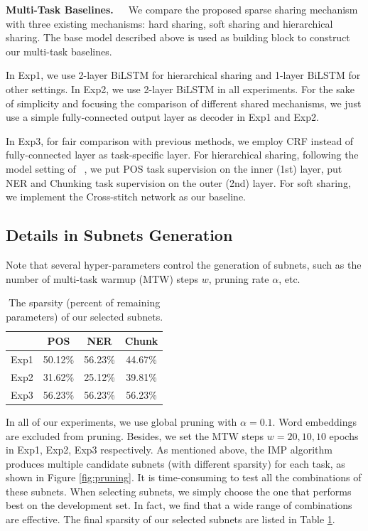 \documentclass[letterpaper]{article} %
\newcommand{\citet}[1]{\citeauthor{#1}~\shortcite{#1}}
\begin{document}
\textbf{Multi-Task Baselines.}\ \ \ We compare the proposed sparse sharing mechanism with three existing mechanisms: hard sharing, soft sharing and hierarchical sharing. The base model described above is used as building block to construct our multi-task baselines.

In Exp1, we use 2-layer BiLSTM for hierarchical sharing and 1-layer BiLSTM for other settings. In Exp2, we use 2-layer BiLSTM in all experiments.
For the sake of simplicity and focusing the comparison of different shared mechanisms, we just use a simple fully-connected output layer as decoder in Exp1 and Exp2.

In Exp3, for fair comparison with previous methods, we employ CRF \cite{DBLP:conf/icml/LaffertyMP01} instead of fully-connected layer as task-specific layer. For hierarchical sharing, following the model setting of \citet{DBLP:conf/acl/SogaardG16}, we put POS task supervision on the inner (1st) layer, put NER and Chunking task supervision on the outer (2nd) layer. For soft sharing, we implement the Cross-stitch network \cite{DBLP:conf/cvpr/MisraSGH16} as our baseline.

\subsection{Details in Subnets Generation}
Note that several hyper-parameters control the generation of subnets, such as the number of multi-task warmup (MTW) steps $w$, pruning rate $\alpha$, etc.

\begin{table}[htbp]
\centering
\begin{tabular}{lccc}
\toprule
     & POS     & NER     & Chunk   \\ \midrule
Exp1 & 50.12\% & 56.23\% & 44.67\% \\
Exp2 & 31.62\% & 25.12\% & 39.81\% \\
Exp3 & 56.23\% & 56.23\% & 56.23\% \\
\bottomrule
\end{tabular}
\caption{The sparsity (percent of remaining parameters) of our selected subnets.}
\label{tb:sparsity}
\end{table}

In all of our experiments, we use global pruning with $\alpha=0.1$. Word embeddings are excluded from pruning. Besides, we set the MTW steps $w=20, 10, 10$ epochs in Exp1, Exp2, Exp3 respectively. As mentioned above, the IMP algorithm produces multiple candidate subnets (with different sparsity) for each task, as shown in Figure \ref{fig:pruning}. It is time-consuming to test all the combinations of these subnets. When selecting subnets, we simply choose the one that performs best on the development set. In fact, we find that a wide range of combinations are effective. The final sparsity of our selected subnets are listed in Table \ref{tb:sparsity}.
\end{document}
